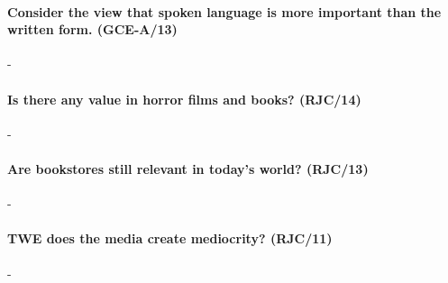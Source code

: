 \documentclass[../../main]{subfiles}
\begin{document}
\paragraph{Consider the view that spoken language is more important than the written form. (GCE-A/13)}-

\paragraph{Is there any value in horror films and books? (RJC/14)}-

\paragraph{Are bookstores still relevant in today's world? (RJC/13)}-

\paragraph{TWE does the media create mediocrity? (RJC/11)}-
\end{document}
